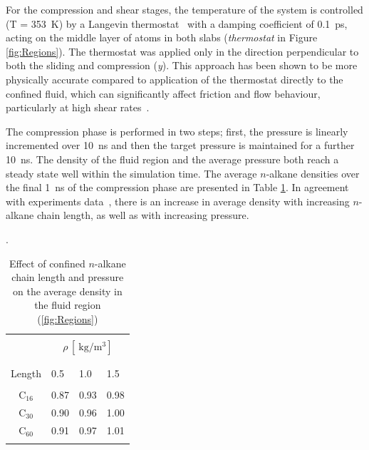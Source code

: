 \documentclass[5p]{elsarticle}
\begin{document}
For the compression and shear stages, the temperature of the system is controlled (T = \SI{353}{\kelvin}) by a Langevin thermostat~\cite{Schneider1978} with a damping coefficient of \SI{0.1}{\pico\second}, acting on the middle layer of atoms in both slabs (\textit{thermostat} in Figure \ref{fig:Regions}). The thermostat was applied only in the direction perpendicular to both the sliding and compression (\emph{y}). This approach has been shown to be more physically accurate compared to application of the thermostat directly to the confined fluid, which can significantly affect friction and flow behaviour, particularly at high shear rates~\cite{Liem1992,Bernardi2010,Yong2013}.

The compression phase is performed in two steps; first, the pressure is linearly incremented over \SI{10}{\nano\second} and then the target pressure is maintained for a further \SI{10}{\nano\second}. The density of the fluid region and the average pressure both reach a steady state well within the simulation time. The average $n$-alkane densities over the final \SI{1}{\nano\second} of the compression phase are presented in Table \ref{tab:rho}. In agreement with experiments data~\cite{Griesbaum2000}, there is an increase in average density with increasing $n$-alkane chain length, as well as with increasing pressure.

\begin{table}
	\caption{Effect of confined $n$-alkane chain length and pressure on the average density in the fluid region (\ref{fig:Regions})}.   
	\centering     
	\begin{tabular}{c | l l  l}
		\hline\hline\\ [-2ex]

		
										&	\multicolumn{3}{c}{ $\rho \, [\SI{}{\kilogram\per\cubic\meter}]$} \\

		\hline\\ [-2ex]
		\backslashbox{Chain \\ Length}{P $[\SI{}{\giga\pascal}]$}	&	0.5		&	1.0		&	1.5	\\

		\hline\\ [-2ex]
		C$_{16}$								&	0.87	&	0.93	&	0.98	\\
		C$_{30}$							&	0.90	&	0.96	&	1.00	\\	
		C$_{60}$								&	0.91	&	0.97	&	1.01	\\	

		\hline\hline    \\[-2ex]
	\end{tabular}
	\label{tab:rho}  
\end{table}
\end{document}
